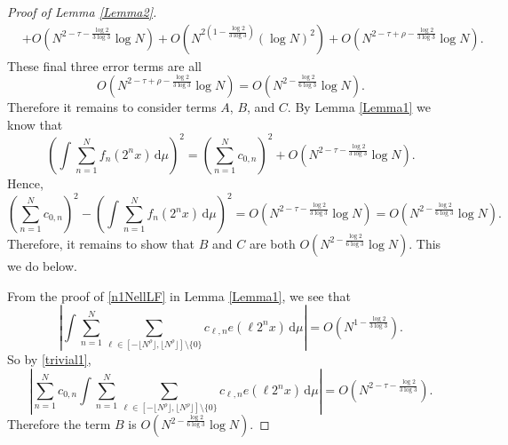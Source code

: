 \documentclass[amssymb,amsfonts,refcheck,12pt,verbatim,righttag]{amsart}
\numberwithin{equation}{section} %
\theoremstyle{plain}
\begin{document}
\begin{proof}[Proof of Lemma \ref{Lemma2}]
\begin{align*}
		&+O\left(N^{2-\tau-\frac{\log2}{3\log3}}\log N\right)+O\left(N^{2(1-\frac{\log2}{3\log3})}(\log N)^2\right)+O\left(N^{2-\tau+\rho-\frac{\log2}{3\log3}}\log N\right) .
	\end{align*} 
    These final three error terms are all $$O\left(N^{2-\tau+\rho-\frac{\log2}{3\log3}}\log N\right)=O\left(N^{2-\frac{\log2}{6\log3}}\log N\right).$$ Therefore it remains to consider terms $A$, $B$, and $C$. By Lemma \ref{Lemma1} we know that 
	$$\left(\int \sum_{n=1}^{N}f_{n}(2^nx)\, \mathrm{d}\mu\right)^{2} = \left(\sum_{n=1}^{N}c_{0,n}\right)^{2}+O\left(N^{2-\tau-\frac{\log2}{3\log3}}\log N\right).$$ Hence,
	$$\left(\sum_{n=1}^{N}c_{0,n}\right)^{2}-\left( \int \sum_{n=1}^{N}f_{n}(2^nx)\, \mathrm{d}\mu\right)^2=O\left(N^{2-\tau-\frac{\log2}{3\log3}}\log N\right)=O\left(N^{2-\frac{\log2}{6\log3}}\log N\right).$$
	Therefore, it remains to show that $B$ and $C$ are both $O\left(N^{2-\frac{\log2}{6\log3}}\log N\right)$. This we do below.
	
From the proof of \eqref{n1NellLF} in Lemma \ref{Lemma1}, we see that $$\left|\int \sum_{n=1}^{N}\sum_{\ell\in [-\lfloor N^{ \rho}\rfloor,\lfloor N^{\rho}\rfloor]\setminus \{0\}}c_{\ell,n}e(\ell 2^nx)\, \mathrm{d}\mu\right|=O\left(N^{1-\frac{\log2}{3\log3}}\right).$$ So by \eqref{trivial1},
	$$\left|\sum_{n=1}^{N}c_{0,n}\int \sum_{n=1}^{N}\sum_{\ell\in [-\lfloor N^{ \rho}\rfloor,\lfloor N^{\rho}\rfloor]\setminus \{0\}}c_{\ell,n}e(\ell 2^nx)\, \mathrm{d}\mu\right|=O\left(  N^{2-\tau-\frac{\log2}{3\log3}}\right).$$
	Therefore the term $B$ is $O\left(N^{2-\frac{\log2}{6\log3}}\log N\right).$
	

\end{proof}
\end{document}
